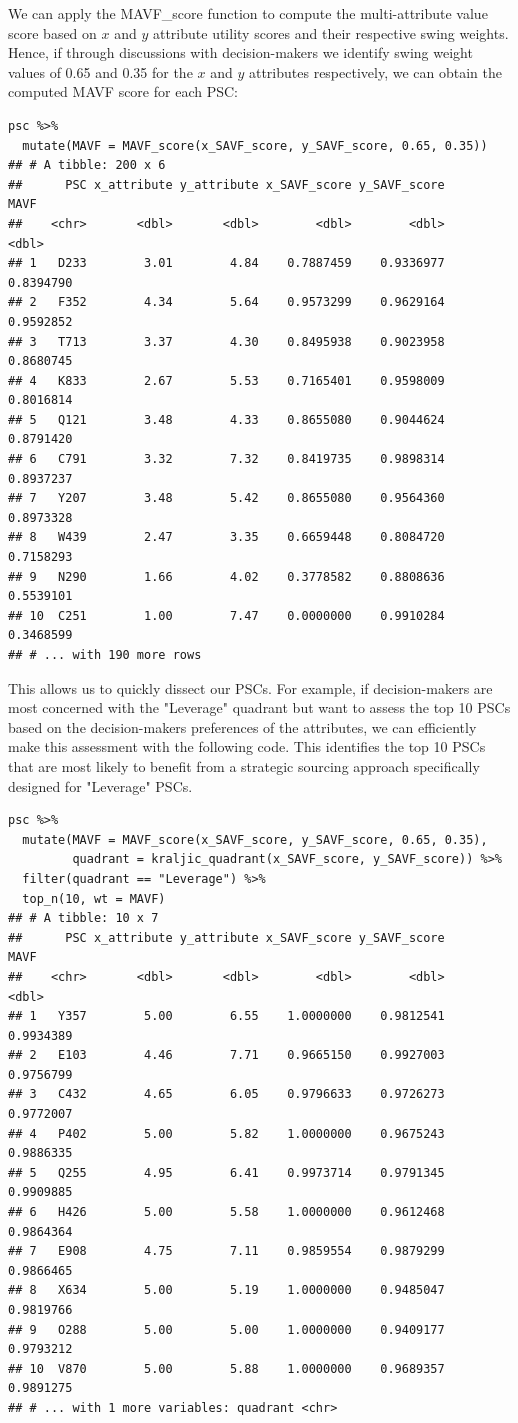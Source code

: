 \documentclass[twocolumn]{svjour3}       %
\begin{document}
We can apply the MAVF\_score function to compute the multi-attribute value score based on $x$ and $y$ attribute utility scores and their respective swing weights. Hence, if through discussions with decision-makers we identify swing weight values of 0.65 and 0.35 for the $x$ and $y$ attributes respectively, we can obtain the computed MAVF score for each PSC:

\begin{Verbatim}[fontsize=\footnotesize]
psc %>%
  mutate(MAVF = MAVF_score(x_SAVF_score, y_SAVF_score, 0.65, 0.35))
## # A tibble: 200 x 6
##      PSC x_attribute y_attribute x_SAVF_score y_SAVF_score      MAVF
##    <chr>       <dbl>       <dbl>        <dbl>        <dbl>     <dbl>
## 1   D233        3.01        4.84    0.7887459    0.9336977 0.8394790
## 2   F352        4.34        5.64    0.9573299    0.9629164 0.9592852
## 3   T713        3.37        4.30    0.8495938    0.9023958 0.8680745
## 4   K833        2.67        5.53    0.7165401    0.9598009 0.8016814
## 5   Q121        3.48        4.33    0.8655080    0.9044624 0.8791420
## 6   C791        3.32        7.32    0.8419735    0.9898314 0.8937237
## 7   Y207        3.48        5.42    0.8655080    0.9564360 0.8973328
## 8   W439        2.47        3.35    0.6659448    0.8084720 0.7158293
## 9   N290        1.66        4.02    0.3778582    0.8808636 0.5539101
## 10  C251        1.00        7.47    0.0000000    0.9910284 0.3468599
## # ... with 190 more rows
\end{Verbatim}

This allows us to quickly dissect our PSCs. For example, if decision-makers are most concerned with the "Leverage" quadrant but want to assess the top 10 PSCs based on the decision-makers preferences of the attributes, we can efficiently make this assessment with the following code. This identifies the top 10 PSCs that are most likely to benefit from a strategic sourcing approach specifically designed for "Leverage" PSCs.
\begin{Verbatim}[fontsize=\footnotesize]
psc %>%
  mutate(MAVF = MAVF_score(x_SAVF_score, y_SAVF_score, 0.65, 0.35),
         quadrant = kraljic_quadrant(x_SAVF_score, y_SAVF_score)) %>%
  filter(quadrant == "Leverage") %>%
  top_n(10, wt = MAVF)
## # A tibble: 10 x 7
##      PSC x_attribute y_attribute x_SAVF_score y_SAVF_score      MAVF
##    <chr>       <dbl>       <dbl>        <dbl>        <dbl>     <dbl>
## 1   Y357        5.00        6.55    1.0000000    0.9812541 0.9934389
## 2   E103        4.46        7.71    0.9665150    0.9927003 0.9756799
## 3   C432        4.65        6.05    0.9796633    0.9726273 0.9772007
## 4   P402        5.00        5.82    1.0000000    0.9675243 0.9886335
## 5   Q255        4.95        6.41    0.9973714    0.9791345 0.9909885
## 6   H426        5.00        5.58    1.0000000    0.9612468 0.9864364
## 7   E908        4.75        7.11    0.9859554    0.9879299 0.9866465
## 8   X634        5.00        5.19    1.0000000    0.9485047 0.9819766
## 9   O288        5.00        5.00    1.0000000    0.9409177 0.9793212
## 10  V870        5.00        5.88    1.0000000    0.9689357 0.9891275
## # ... with 1 more variables: quadrant <chr>
\end{Verbatim}
\end{document}
